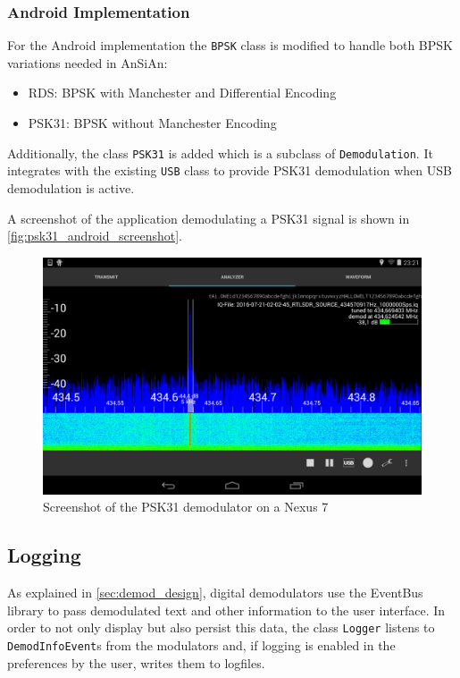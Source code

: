 \subsubsection{Android Implementation}

For the Android implementation the \texttt{BPSK} class is modified to handle both
\ac{BPSK} variations needed in \ac{AnSiAn}:
\begin{itemize}
	\item RDS: BPSK with Manchester and Differential Encoding
	\item PSK31: BPSK without Manchester Encoding
\end{itemize}

Additionally, the class \texttt{PSK31} is added which is a subclass of \texttt{Demodulation}.
It integrates with the existing \texttt{USB} class to provide PSK31 demodulation
when USB demodulation is active.

A screenshot of the application demodulating a \ac{PSK31} signal is shown in 
\autoref{fig:psk31_android_screenshot}.

\begin{figure}
	\centering
	\includegraphics[width=1\linewidth]{gfx/psk31/psk31_android_screenshot.png}
	\caption{Screenshot of the PSK31 demodulator on a Nexus 7}
	\label{fig:psk31_android_screenshot}
\end{figure}

\subsection{Logging\label{sec:logging}}

As explained in \autoref{sec:demod_design}, digital demodulators use the EventBus library to pass demodulated text and other information to the user interface. In order to not only display but also persist this data, the class \texttt{Logger} listens to \texttt{DemodInfoEvent}s from the modulators and, if logging is enabled in the preferences by the user, writes them to logfiles.

